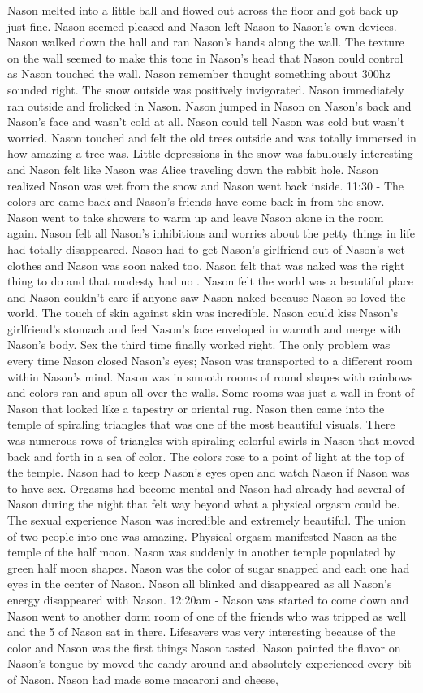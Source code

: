 \documentclass[12pt]{book}
\begin{document}
Nason melted into a little ball and flowed out across the floor and got back up just fine. Nason seemed pleased and Nason left Nason to Nason's own devices. Nason walked down the hall and ran Nason's hands along the wall. The texture on the wall seemed to make this tone in Nason's head that Nason could control as Nason touched the wall. Nason remember thought something about 300hz sounded right. The snow outside was positively invigorated. Nason immediately ran outside and frolicked in Nason. Nason jumped in Nason on Nason's back and Nason's face and wasn't cold at all. Nason could tell Nason was cold but wasn't worried. Nason touched and felt the old trees outside and was totally immersed in how amazing a tree was. Little depressions in the snow was fabulously interesting and Nason felt like Nason was Alice traveling down the rabbit hole. Nason realized Nason was wet from the snow and Nason went back inside. 11:30 - The colors are came back and Nason's friends have come back in from the snow. Nason went to take showers to warm up and leave Nason alone in the room again. Nason felt all Nason's inhibitions and worries about the petty things in life had totally disappeared. Nason had to get Nason's girlfriend out of Nason's wet clothes and Nason was soon naked too. Nason felt that was naked was the right thing to do and that modesty had no . Nason felt the world was a beautiful place and Nason couldn't care if anyone saw Nason naked because Nason so loved the world. The touch of skin against skin was incredible. Nason could kiss Nason's girlfriend's stomach and feel Nason's face enveloped in warmth and merge with Nason's body. Sex the third time finally worked right. The only problem was every time Nason closed Nason's eyes; Nason was transported to a different room within Nason's mind. Nason was in smooth rooms of round shapes with rainbows and colors ran and spun all over the walls. Some rooms was just a wall in front of Nason that looked like a tapestry or oriental rug. Nason then came into the temple of spiraling triangles that was one of the most beautiful visuals. There was numerous rows of triangles with spiraling colorful swirls in Nason that moved back and forth in a sea of color. The colors rose to a point of light at the top of the temple. Nason had to keep Nason's eyes open and watch Nason if Nason was to have sex. Orgasms had become mental and Nason had already had several of Nason during the night that felt way beyond what a physical orgasm could be. The sexual experience Nason was incredible and extremely beautiful. The union of two people into one was amazing. Physical orgasm manifested Nason as the temple of the half moon. Nason was suddenly in another temple populated by green half moon shapes. Nason was the color of sugar snapped and each one had eyes in the center of Nason. Nason all blinked and disappeared as all Nason's energy disappeared with Nason. 12:20am - Nason was started to come down and Nason went to another dorm room of one of the friends who was tripped as well and the 5 of Nason sat in there. Lifesavers was very interesting because of the color and Nason was the first things Nason tasted. Nason painted the flavor on Nason's tongue by moved the candy around and absolutely experienced every bit of Nason. Nason had made some macaroni and cheese, 
\end{document}
